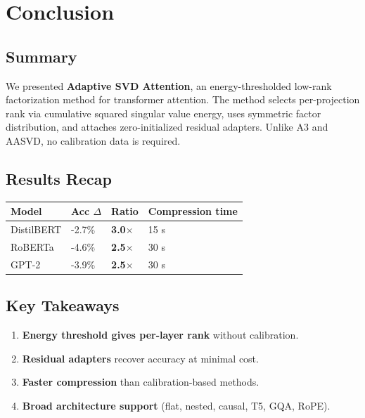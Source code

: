 
\section{Conclusion}

\subsection{Summary}

We presented \textbf{Adaptive SVD Attention}, an energy-thresholded low-rank 
factorization method for transformer attention. The method selects per-projection 
rank via cumulative squared singular value energy, uses symmetric factor 
distribution, and attaches zero-initialized residual adapters. Unlike A3 and 
AASVD, no calibration data is required.

\subsection{Results Recap}

\begin{table}[H]
\centering
\small
\begin{tabular}{llll}
\toprule
\textbf{Model} & \textbf{Acc $\Delta$} & \textbf{Ratio} & \textbf{Compression time} \\
\midrule
DistilBERT & -2.7\% & \textbf{3.0$\times$} & 15 s \\
RoBERTa & -4.6\% & \textbf{2.5$\times$} & 30 s \\
GPT-2 & -3.9\% & \textbf{2.5$\times$} & 30 s \\
\bottomrule
\end{tabular}
\end{table}

\subsection{Key Takeaways}

\begin{enumerate}
\item \textbf{Energy threshold gives per-layer rank} without calibration.
\item \textbf{Residual adapters} recover accuracy at minimal cost.
\item \textbf{Faster compression} than calibration-based methods.
\item \textbf{Broad architecture support} (flat, nested, causal, T5, GQA, RoPE).

\end{enumerate}
